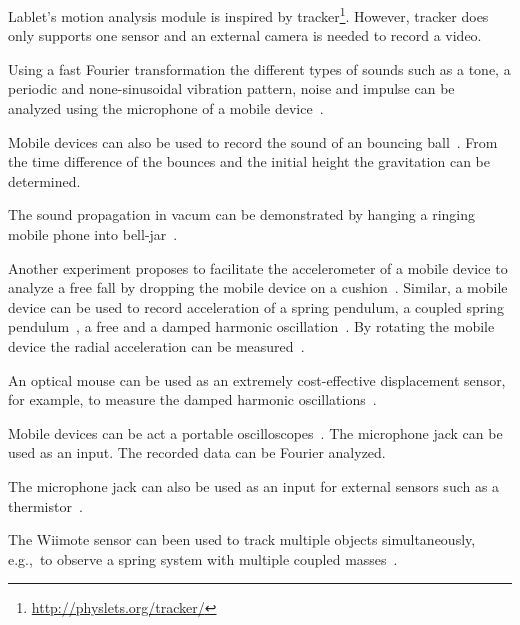\documentclass{sigchi}
\newcommand{\eg}{e.g.,\ }
\begin{document}
Lablet's motion analysis module is inspired by tracker\footnote{\url{http://physlets.org/tracker/}}.
However, tracker does only supports one sensor and an external camera is needed to record a video.

Using a fast Fourier transformation the different types of sounds such as a tone, a periodic and none-sinusoidal vibration pattern, noise and impulse can be analyzed using the microphone of a mobile device~\cite{KuhnAcousticPhenomena2013}.

Mobile devices can also be used to record the sound of an bouncing ball~\cite{Schwarz2013Acoustic}.
From the time difference of the bounces and the initial height the gravitation can be determined.

The sound propagation in vacum can be demonstrated by hanging a ringing mobile phone into bell-jar~\cite{CaleonBellJar2013}.



Another experiment proposes to facilitate the accelerometer of a mobile device to analyze a free fall by dropping the mobile device on a cushion~\cite{VogtFreeFall2012}.
Similar, a mobile device can be used to record acceleration of a spring pendulum, a coupled spring pendulum~\cite{KuhnPendulum2012}, a free and a damped harmonic oscillation~\cite{Castro2013}.
By rotating the mobile device the radial acceleration can be measured~\cite{VogtRadialAcc2013}.



An optical mouse can be used as an extremely cost-effective displacement sensor, for example, to measure the damped harmonic oscillations~\cite{Ng2005}.

Mobile devices can be act a portable oscilloscopes~\cite{Forinash2012}.
The microphone jack can be used as an input.
The recorded data can be Fourier analyzed.

The microphone jack can also be used as an input for external sensors such as a thermistor~\cite{Forinash2012}.

The Wiimote sensor can been used to track multiple objects simultaneously, \eg to observe a spring system with multiple coupled masses~\cite{Skeffington2012}.
\end{document}
